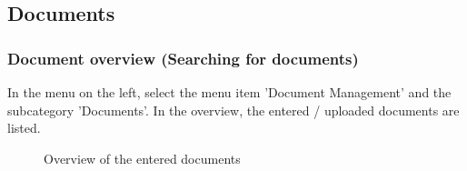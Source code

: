 \pagebreak
\subsection{Documents}
\label{bkm:Ref442273482}

\subsubsection{Document overview (Searching for documents)}
\label{bkm:Ref443047823}

In the menu on the left, select the menu item 'Document Management' and the subcategory 'Documents'. In the overview, the entered / uploaded documents are listed.

\begin{figure}[H]
\caption{Overview of the entered documents}
\end{figure}

